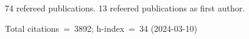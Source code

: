 74 refereed publications. 13 refeered publications as first author.

Total citations~=~3892; h-index~=~34 (2024-03-10)